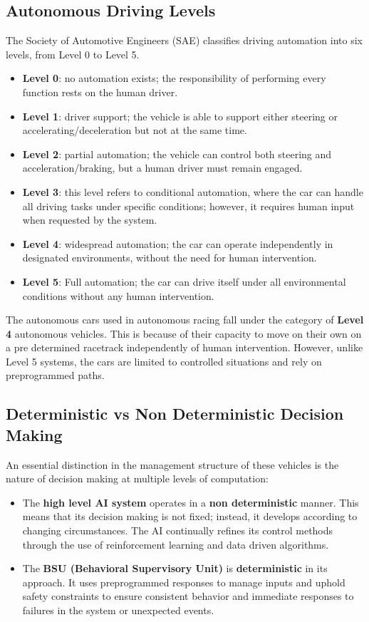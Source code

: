 \documentclass[a4paper,final,12pt]{report}
\begin{document}
\subsection{Autonomous Driving Levels}
The Society of Automotive Engineers (SAE) classifies driving automation into six levels, from Level 0 to Level 5.
\begin{itemize}
    \item \textbf{Level 0}: no automation exists; the responsibility of performing every function rests on the human driver.
    \item \textbf{Level 1}: driver support; the vehicle is able to support either steering or accelerating/deceleration but not at the same time.
    \item \textbf{Level 2}: partial automation; the vehicle can control both steering and acceleration/braking, but a human driver must remain engaged.
    \item \textbf{Level 3}: this level refers to conditional automation, where the car can handle all driving tasks under specific conditions; however, it requires human input when requested by the system.
    \item \textbf{Level 4}: widespread automation; the car can operate independently in designated environments, without the need for human intervention.
    \item \textbf{Level 5}: Full automation; the car can drive itself under all environmental conditions without any human intervention.
\end{itemize}

The autonomous cars used in autonomous racing fall under the category of \textbf{Level 4} autonomous vehicles. This is because of their capacity to move on their own on a pre determined racetrack independently of human intervention. However, unlike Level 5 systems, the cars are limited to controlled situations and rely on preprogrammed paths.

\subsection{Deterministic vs Non Deterministic Decision Making}
An essential distinction in the management structure of these vehicles is the nature of decision making at multiple levels of computation:
\begin{itemize}
    \item The \textbf{high level AI system} operates in a \textbf{non deterministic} manner. This means that its decision making is not fixed; instead, it develops according to changing circumstances. The AI continually refines its control methods through the use of reinforcement learning and data driven algorithms.
    \item The \textbf{BSU (Behavioral Supervisory Unit)} is \textbf{deterministic} in its approach. It uses preprogrammed responses to manage inputs and uphold safety constraints to ensure consistent behavior and immediate responses to failures in the system or unexpected events.
\end{itemize}
\end{document}

